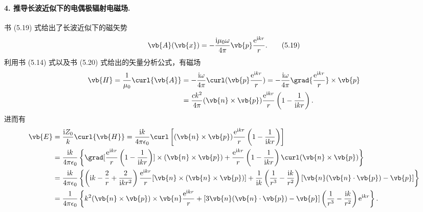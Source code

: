 \documentclass[12pt]{article}
\begin{document}
\paragraph{4. 推导长波近似下的电偶极辐射电磁场.}
书 (5.19) 式给出了长波近似下的磁矢势
\begin{equation}
  \vb{A}(\vb{x}) = -\frac{\mathrm{i} \mu_0 \omega}{4\pi} \vb{p} \frac{\mathrm{e}^{\mathrm{i} kr}}{r}. \tag{5.19}
\end{equation}
利用书 (5.14) 式以及书 (5.20) 式给出的矢量分析公式，有磁场
\begin{align}
  \vb{H} = \frac{1}{\mu_0} \curl{\vb{A}} &= -\frac{\mathrm{i} \omega}{4\pi} \curl(\vb{p} \frac{\mathrm{e}^{\mathrm{i} kr}}{r}) = -\frac{\mathrm{i} \omega}{4\pi} \grad{\frac{\mathrm{e}^{\mathrm{i} kr}}{r}} \times \vb{p} \notag\\
  &= \frac{ck^2}{4\pi} (\vb{n} \times \vb{p}) \frac{\mathrm{e}^{\mathrm{i} kr}}{r} \left(1 - \frac{1}{\mathrm{i} kr}\right).
\end{align}
进而有
\begin{align}
  \vb{E} &= \frac{\mathrm{i} Z_0}{k} \curl{\vb{H}} = \frac{\mathrm{i} k}{4\pi \epsilon_0} \curl \left[(\vb{n} \times \vb{p}) \frac{\mathrm{e}^{\mathrm{i} kr}}{r} \left(1 - \frac{1}{\mathrm{i} kr}\right)\right] \notag\\
  &= \frac{\mathrm{i} k}{4\pi \epsilon_0} \left\{\grad[\frac{\mathrm{e}^{\mathrm{i} kr}}{r} \left(1 - \frac{1}{\mathrm{i} kr}\right)] \times (\vb{n} \times \vb{p}) + \frac{\mathrm{e}^{\mathrm{i} kr}}{r} \left(1 - \frac{1}{\mathrm{i} kr}\right) \curl(\vb{n} \times \vb{p})\right\} \notag\\
  &= \frac{\mathrm{i} k}{4\pi \epsilon_0} \left\{\left(\mathrm{i}k - \frac{2}{r} + \frac{2}{\mathrm{i} kr^2}\right) \frac{\mathrm{e}^{\mathrm{i} kr}}{r} [\vb{n} \times (\vb{n} \times \vb{p})] + \frac{1}{\mathrm{i} k} \left(\frac{1}{r^3} - \frac{\mathrm{i} k}{r^2}\right) [\vb{n}(\vb{n} \cdot \vb{p}) - \vb{p}]\right\} \notag\\
  &= \frac{1}{4\pi \epsilon_0} \left\{k^2 (\vb{n} \times \vb{p}) \times \vb{n} \frac{\mathrm{e}^{\mathrm{i} kr}}{r} + [3\vb{n} (\vb{n} \cdot \vb{p}) - \vb{p}]\left(\frac{1}{r^3} - \frac{\mathrm{i} k}{r^2}\right) \mathrm{e}^{\mathrm{i} kr}\right\}.
\end{align}
\end{document}
